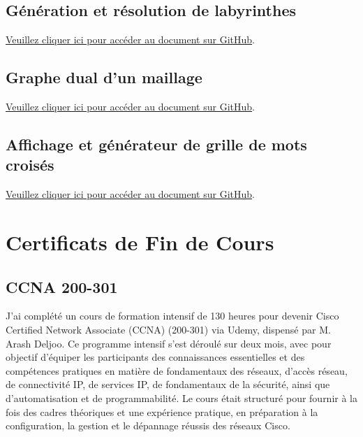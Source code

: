 \documentclass{article}
\begin{document}
    \subsection{Génération et résolution de labyrinthes}

    \href{https://github.com/jafarizadeh/CV---lettre/tree/a64fa195620766a9cf39fd42a2fd963779d13f6f/Document/Projets/Co-author}{Veuillez cliquer ici pour accéder au document sur GitHub}.
    
    \subsection{Graphe dual d’un maillage}

    \href{https://github.com/jafarizadeh/CV---lettre/tree/a64fa195620766a9cf39fd42a2fd963779d13f6f/Document/Projets/Co-author}{Veuillez cliquer ici pour accéder au document sur GitHub}.
    
    \subsection{Affichage et générateur de grille de mots croisés}

    \href{https://github.com/jafarizadeh/CV---lettre/tree/a64fa195620766a9cf39fd42a2fd963779d13f6f/Document/Projets/Co-author}{Veuillez cliquer ici pour accéder au document sur GitHub}.
    
   
    

    

    \newpage


\section{Certificats de Fin de Cours}

    \subsection{CCNA 200-301}

    J'ai complété un cours de formation intensif de 130 heures pour devenir Cisco Certified Network Associate (CCNA) (200-301) via Udemy, dispensé par M. Arash Deljoo. Ce programme intensif s'est déroulé sur deux mois, avec pour objectif d'équiper les participants des connaissances essentielles et des compétences pratiques en matière de fondamentaux des réseaux, d'accès réseau, de connectivité IP, de services IP, de fondamentaux de la sécurité, ainsi que d'automatisation et de programmabilité. Le cours était structuré pour fournir à la fois des cadres théoriques et une expérience pratique, en préparation à la configuration, la gestion et le dépannage réussis des réseaux Cisco.
\end{document}
